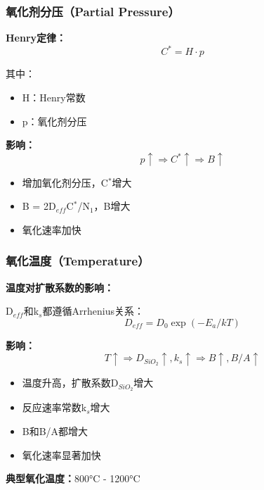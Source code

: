 \documentclass[UTF8,12pt,a4paper]{ctexart}
\begin{document}
\subsubsection{氧化剂分压（Partial Pressure）}

\textbf{Henry定律：}
\begin{equation}
C^* = H \cdot p
\end{equation}

其中：
\begin{itemize}
    \item H：Henry常数
    \item p：氧化剂分压
\end{itemize}

\textbf{影响：}
\begin{equation}
p \uparrow \Rightarrow C^* \uparrow \Rightarrow B \uparrow
\end{equation}

\begin{itemize}
    \item 增加氧化剂分压，C$^*$增大
    \item B = 2D$_{eff}$C$^*$/N$_1$，B增大
    \item 氧化速率加快
\end{itemize}

\subsubsection{氧化温度（Temperature）}

\textbf{温度对扩散系数的影响：}

D$_{eff}$和k$_s$都遵循Arrhenius关系：
\begin{equation}
D_{eff} = D_0 \exp(-E_a/kT)
\end{equation}

\textbf{影响：}
\begin{equation}
T \uparrow \Rightarrow D_{SiO_2} \uparrow, k_s \uparrow \Rightarrow B \uparrow, B/A \uparrow
\end{equation}

\begin{itemize}
    \item 温度升高，扩散系数D$_{SiO_2}$增大
    \item 反应速率常数k$_s$增大
    \item B和B/A都增大
    \item 氧化速率显著加快
\end{itemize}

\textbf{典型氧化温度：}800°C - 1200°C
\end{document}
